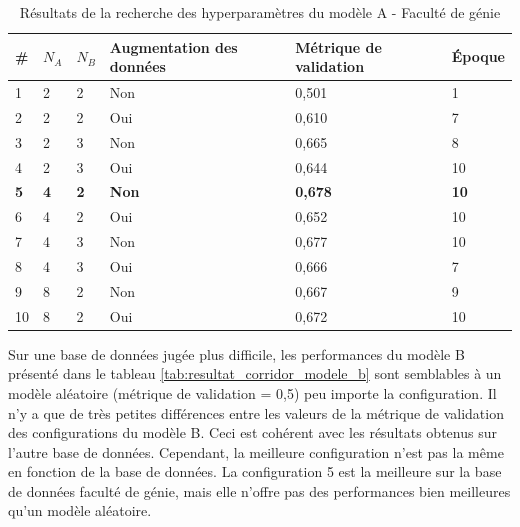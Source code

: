     \begin{table}
        \centering
        \caption{Résultats de la recherche des hyperparamètres du modèle A - Faculté de génie}
        \label{tab:resultat_corridor_modele_a}
        \begin{tabular}{lllp{3cm}p{3cm}l}
            \midrule
            \# & \(N_A\) & \(N_B\) & Augmentation des données & Métrique de validation & Époque\\
            \midrule\midrule
            1  & 2 & 2 & Non & 0,501 & 1\\
            2  & 2 & 2 & Oui & 0,610 & 7\\
            3  & 2 & 3 & Non & 0,665 & 8\\
            4  & 2 & 3 & Oui & 0,644 & 10\\
            \textbf{5}  & \textbf{4} & \textbf{2} & \textbf{Non} & \textbf{0,678} & \textbf{10}\\
            6  & 4 & 2 & Oui & 0,652 & 10\\
            7  & 4 & 3 & Non & 0,677 & 10\\
            8  & 4 & 3 & Oui & 0,666 & 7\\
            9  & 8 & 2 & Non & 0,667 & 9\\
            10 & 8 & 2 & Oui & 0,672 & 10\\
            \midrule
        \end{tabular}
    \end{table}
    
    Sur une base de données jugée plus difficile, les performances du modèle B présenté dans le tableau \ref{tab:resultat_corridor_modele_b} sont semblables à un modèle aléatoire (métrique de validation = 0,5) peu importe la configuration. Il n'y a que de très petites différences entre les valeurs de la métrique de validation des configurations du modèle B. Ceci est cohérent avec les résultats obtenus sur l'autre base de données. Cependant, la meilleure configuration n'est pas la même en fonction de la base de données. La configuration 5 est la meilleure sur la base de données faculté de génie, mais elle n'offre pas des performances bien meilleures qu'un modèle aléatoire.
    \bigskip
    
